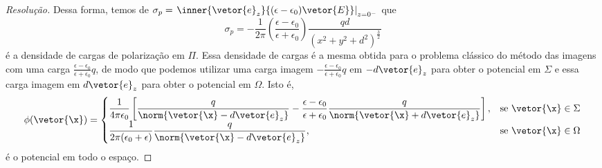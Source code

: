 \begin{proof}[Resolução]
    Dessa forma, temos de \(\sigma_p = \left.\inner{\vetor{e}_z}{(\epsilon - \epsilon_0)\vetor{E}}\right|_{z = 0^-}\) que
    \begin{equation*}
        \sigma_p = -\frac{1}{2\pi}\left(\frac{\epsilon - \epsilon_0}{\epsilon + \epsilon_0}\right)\frac{qd}{(x^2 + y^2 + d^2)^{\frac32}}
    \end{equation*}
    é a densidade de cargas de polarização em \(\Pi\). Essa densidade de cargas é a mesma obtida para o problema clássico do método das imagens com uma carga \(\frac{\epsilon - \epsilon_0}{\epsilon + \epsilon_0}q\), de modo que podemos utilizar uma carga imagem \(- \frac{\epsilon - \epsilon_0}{\epsilon + \epsilon_0}q\) em \(-d\vetor{e}_z\) para obter o potencial em \(\Sigma\) e essa carga imagem em \(d\vetor{e}_z\) para obter o potencial em \(\Omega\). Isto é,
    \begin{equation*}
        \phi(\vetor{\x}) = \begin{cases}
            \displaystyle \frac{1}{4\pi \epsilon_0}\left[\frac{q}{\norm{\vetor{\x} - d\vetor{e}_z}} - \frac{\epsilon - \epsilon_0}{\epsilon + \epsilon_0}\frac{q}{\norm{\vetor{\x} + d\vetor{e}_z}}\right],&\text{se }\vetor{\x} \in \Sigma\\
            \displaystyle \frac{1}{2\pi(\epsilon_0+\epsilon)}\frac{q}{\norm{\vetor{\x} - d\vetor{e}_z}},&\text{se }\vetor{\x} \in \Omega
        \end{cases}
    \end{equation*}
    é o potencial em todo o espaço.
\end{proof}
